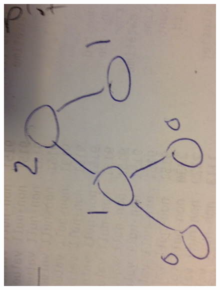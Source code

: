 \begin{figure}[!h]
    \centering
    \includegraphics[width=0.9\columnwidth]{idea_height}
    \label{idea_height}
\end{figure}

